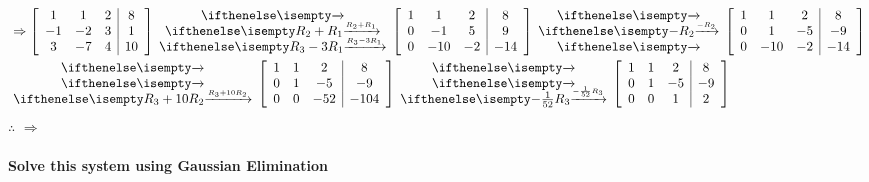 \documentclass[
  letterpaper,
  DIV=11,
  numbers=noendperiod]{scrartcl}
\let\oldparagraph\paragraph
\renewcommand{\paragraph}[1]{\oldparagraph{#1}\mbox{}}
\begin{document}
\begin{equation*}
\begin{aligned}
&\Rightarrow \left[\begin{array}{ccc|c}1 & 1 & 2 & 8 \\ -1 & -2 & 3 & 1 \\ 3 & -7 & 4 & 10\end{array}\right] \rowops{,R_2+R_1,R_3-3R_1}\left[\begin{array}{ccc|c}1 & 1 & 2 & 8 \\ 0 & -1 & 5 & 9 \\ 0 & -10 & -2 & -14\end{array}\right] \rowops{,-R_2,} \left[\begin{array}{ccc|c}1 & 1 & 2 & 8 \\ 0 & 1 & -5 & -9 \\ 0 & -10 & -2 & -14\end{array}\right] \\
&\rowops{,,R_3+10R_2} \left[\begin{array}{ccc|c}1 & 1 & 2 & 8 \\ 0 & 1 & -5 & -9 \\ 0 & 0 & -52 & -104\end{array}\right]\rowops{,,-\frac{1}{52}R_3}\left[\begin{array}{ccc|c}1 & 1 & 2 & 8 \\ 0 & 1 & -5 & -9 \\ 0 & 0 & 1 & 2\end{array}\right]
\end{aligned}
\end{equation*} \(\therefore\)
 \(\Rightarrow\)

\paragraph{Solve this system using Gaussian
Elimination}\label{solve-this-system-using-gaussian-elimination-1}

\end{document}
